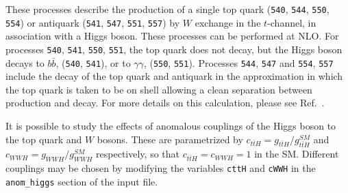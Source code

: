 
\label{subsec:Ht}
These processes describe the production of a single top quark ({\tt 540}, {\tt 544}, {\tt 550},
{\tt 554}) or antiquark ({\tt 541}, {\tt 547}, {\tt 551}, {\tt 557}) by $W$ exchange in the
$t$-channel, in association with a Higgs boson. These processes can be performed at NLO.
For processes {\tt 540}, {\tt 541}, {\tt 550},
{\tt 551}, the top quark does not decay, but the
Higgs boson decays to $b\bar{b}$, ({\tt 540}, {\tt 541}), or to $\gamma \gamma$, ({\tt 550}, {\tt 551}).
Processes {\tt 544}, {\tt 547} and {\tt 554}, {\tt 557} include the decay of the top quark and antiquark
in the approximation in which the top quark is taken to be on shell allowing a clean separation
between production and decay.
For more details on this calculation, please see Ref.~\cite{Campbell:2013yla}.

It is possible to study the effects of anomalous couplings of the Higgs boson to the top quark and $W$ bosons. These
are parametrized by $c_{t\bar{t}H} = g_{t\bar{t}H}/g_{t\bar{t}H}^{SM}$ and $c_{WWH} = g_{WWH}/g_{WWH}^{SM}$
respectively, so that $c_{t\bar{t}H}=c_{WWH}=1$ in the SM. Different couplings may be chosen by modifying the variables
{\tt cttH} and {\tt cWWH} in the \verb|anom_higgs| section of the input file.
